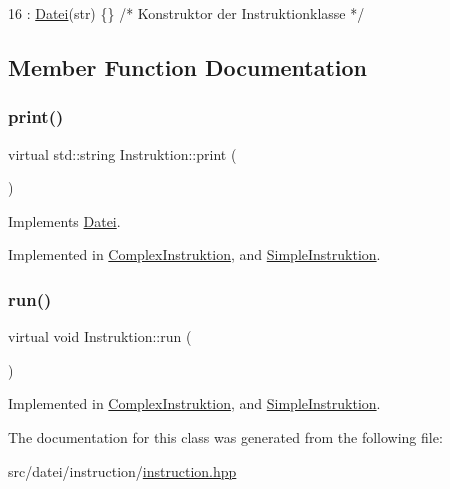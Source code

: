 \begin{DoxyCode}
16 : \mbox{\hyperlink{class_datei_a9a9e1149154603548fdfc889821cf418}{Datei}}(str) \{\}    \textcolor{comment}{/* Konstruktor der Instruktionklasse */}
\end{DoxyCode}


\subsection{Member Function Documentation}
\mbox{\label{class_instruktion_a267ff36e98ec889cceccb2f464c36bc6}} 
\subsubsection{\texorpdfstring{print()}{print()}}
{\footnotesize\ttfamily virtual std\+::string Instruktion\+::print (\begin{DoxyParamCaption}{ }\end{DoxyParamCaption})\hspace{0.3cm}{\ttfamily [pure virtual]}}



Implements \mbox{\hyperlink{class_datei_a5dedc9776ebe637f0842300f648d4b17}{Datei}}.



Implemented in \mbox{\hyperlink{class_complex_instruktion_a476d0f6ed0296cd4751543c4be6ca422}{Complex\+Instruktion}}, and \mbox{\hyperlink{class_simple_instruktion_a0533865319bd39a0ecd1db463d488cb8}{Simple\+Instruktion}}.

\mbox{\label{class_instruktion_ad701f6b5537e5aa8c8c08b81a8946f63}} 
\subsubsection{\texorpdfstring{run()}{run()}}
{\footnotesize\ttfamily virtual void Instruktion\+::run (\begin{DoxyParamCaption}\item[{\mbox{\hyperlink{class_virtual_machine}{Virtual\+Machine}} \&}]{ }\end{DoxyParamCaption})\hspace{0.3cm}{\ttfamily [pure virtual]}}



Implemented in \mbox{\hyperlink{class_complex_instruktion_ab9e037eda3cf53252902f15541a01a21}{Complex\+Instruktion}}, and \mbox{\hyperlink{class_simple_instruktion_a5beecc39bbd465d001c41216ef4d46e7}{Simple\+Instruktion}}.



The documentation for this class was generated from the following file\+:\begin{DoxyCompactItemize}
\item 
src/datei/instruction/\mbox{\hyperlink{instruction_8hpp}{instruction.\+hpp}}\end{DoxyCompactItemize}
